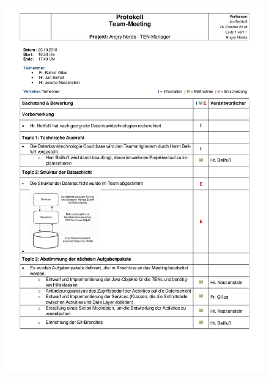 \begin{figure}[H]
\centering
\begin{minipage}[t]{1\textwidth} %
\includegraphics[width=1\textwidth]{img/Protokoll-DataTeam2018-10-26.pdf}\\ %
\end{minipage}
\end{figure}

